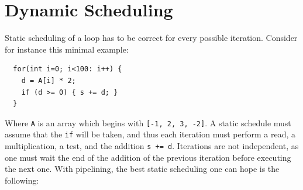 \documentclass{article}
\begin{document}
\section{Dynamic Scheduling}
\label{sec:dynamic}
Static scheduling of a loop has to be correct for every possible iteration.
Consider for instance this minimal example:
\begin{lstlisting}
  for(int i=0; i<100: i++) {
    d = A[i] * 2;
    if (d >= 0) { s += d; }
  } 
\end{lstlisting}
Where \texttt{A} is an array which begins with \texttt{[-1, 2, 3, -2]}.
A static schedule must assume that the \texttt{if} will be taken, and thus each iteration must perform a read, a multiplication, a test, and the addition \texttt{s += d}. Iterations are not independent, as one must wait the end of the addition of the previous iteration before executing the next one.
With pipelining, the best static scheduling one can hope is the following:
\end{document}
